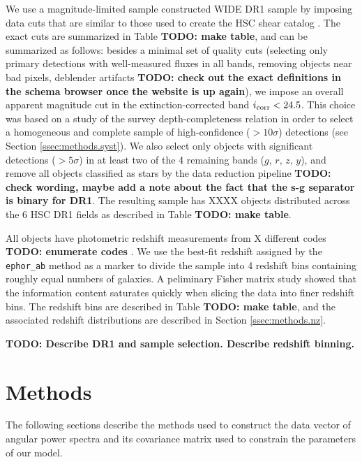 \documentclass[a4paper,11pt]{article}
\newcommand{\todo}[1]{{\bf TODO: #1}}
\begin{document}
  We use a magnitude-limited sample constructed WIDE DR1 sample by imposing data cuts that are similar to those used to create the HSC shear catalog \cite{2018PASJ...70S..25M}. The exact cuts are summarized in Table \todo{make table}, and can be summarized as follows: besides a minimal set of quality cuts (selecting only primary detections with well-measured fluxes in all bands, removing objects near bad pixels, deblender artifacts \todo{check out the exact definitions in the schema browser once the website is up again}), we impose an overall apparent magnitude cut in the extinction-corrected band $i_{\rm corr}<24.5$. This choice was based on a study of the survey depth-completeness relation in order to select a homogeneous and complete sample of high-confidence ($>10\sigma$) detections (see Section \ref{ssec:methods.syst}). We also select only objects with significant detections ($>5\sigma$) in at least two of the 4 remaining bands ($g,\,r,\,z,\,y$), and remove all objects classified as stars by the data reduction pipeline \todo{check wording, maybe add a note about the fact that the s-g separator is binary for DR1}. The resulting sample has XXXX objects distributed across the 6 HSC DR1 fields as described in Table \todo{make table}.
  
  All objects have photometric redshift measurements from X different codes \todo{enumerate codes} \cite{2018PASJ...70S...9T}. We use the best-fit redshift assigned by the {\tt ephor\_ab} method as a marker to divide the sample into 4 redshift bins containing roughly equal numbers of galaxies. A peliminary Fisher matrix study showed that the information content saturates quickly when slicing the data into finer redshift bins. The redshift bins are described in Table \todo{make table}, and the associated redshift distributions are described in Section \ref{ssec:methods.nz}.

  \todo{Describe DR1 and sample selection. Describe redshift binning.}

\section{Methods}\label{sec:methods}
  The following sections describe the methods used to construct the data vector of angular power spectra and its covariance matrix used to constrain the parameters of our model.
  
\end{document}
